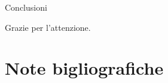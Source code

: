\documentclass{beamer}
\begin{document}
	\begin{frame}{Conclusioni}
		
		Grazie per l'attenzione.
	
	\end{frame}
	\section{Note bigliografiche}





\end{document}
